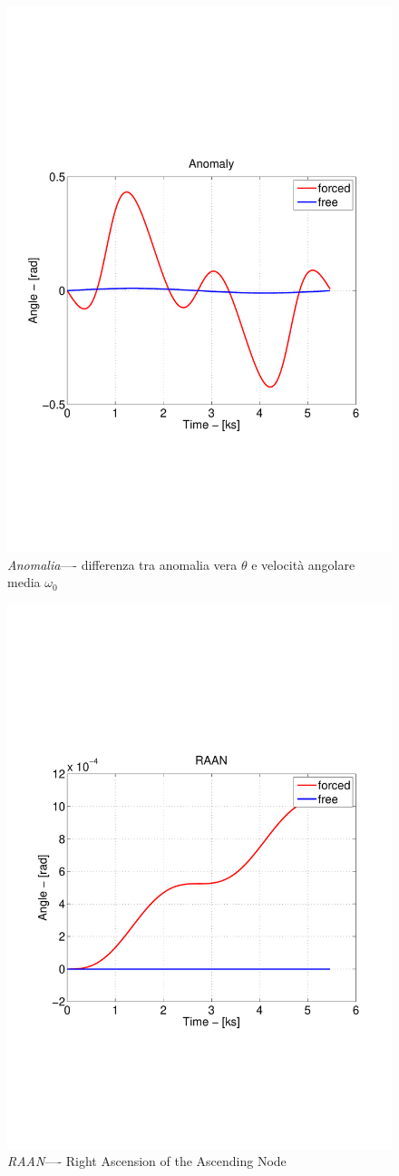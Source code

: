 \begin{figure}
	\includegraphics[width=.6\textwidth,clip=true,trim=1cm
	6cm
	1cm
	8cm]{modelling/orbit_dynamics/image/anomaly.pdf}
	\caption{\emph{Anomalia}---- differenza tra anomalia vera $\theta$ e velocità
	angolare media $\omega_0$}
\end{figure}

\begin{figure}
	\includegraphics[width=.6\textwidth,clip=true,trim=1cm
	6cm
	1cm
	8cm]{modelling/orbit_dynamics/image/RAAN.pdf}
	\caption{\emph{RAAN}---- Right Ascension of the Ascending Node}
\end{figure}